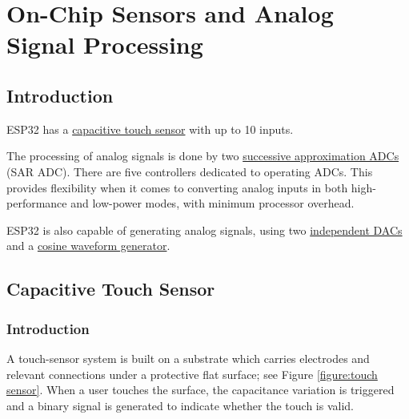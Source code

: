 \documentclass[main\_\_EN.tex]{subfiles}
\begin{document}
\setenglishformatting

\ifglobal
\else
    \listoftodos
    {\let\clearpage\relax \listofdonetodos}
    \tableofcontents
\fi



\hypertarget{sensor}{}
\chapter{On-Chip Sensors and Analog Signal Processing}
\label{mod:sensor}

\section{Introduction}

ESP32 has a \hyperref[ssec:touch sensor]{capacitive touch sensor} with up to 10 inputs. 

The processing of analog signals is done by two \hyperref[ssec:saradc]{successive approximation ADCs} (SAR ADC). There are five controllers dedicated to operating ADCs. This provides flexibility when it comes to converting analog inputs in both high-performance and low-power modes, with minimum processor overhead.

ESP32 is also capable of generating analog signals, using two \hyperref[ssec:dac]{independent DACs} and a \hyperref[ssec:cosine gen]{cosine waveform generator}.

\section{Capacitive Touch Sensor}\label{ssec:touch sensor}

\subsection{Introduction}

A touch-sensor system is built on a substrate which carries electrodes and relevant connections under a protective flat surface; see Figure \ref{figure:touch sensor}. When a user touches the surface, the capacitance variation is triggered and a binary signal is generated to indicate whether the touch is valid.
\end{document}
